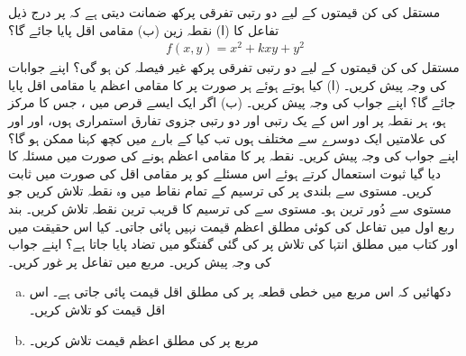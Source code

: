 مستقل  کی کن قیمتوں کے لیے دو رتبی تفرقی پرکھ ضمانت دیتی ہے کہ   پر درج ذیل تفاعل  کا (ا)  نقطہ زین (ب) مقامی اقل     پایا جائے گا؟
\begin{align*}
f(x,y)=x^2+kxy+y^2
\end{align*}
  مستقل  کی کن قیمتوں کے لیے دو رتبی تفرقی پرکھ غیر  فیصلہ کن ہو گی؟ اپنے جوابات کی وجہ پیش کریں۔
(ا) کیا  ہوتے ہوئے ہر   صورت  پر  کا مقامی اعظم  یا مقامی  اقل پایا جائے گا؟ اپنے جواب کی وجہ پیش کریں۔   (ب)  اگر ایک  ایسے قرص  میں ، جس کا مرکز   ہو،  ہر نقطہ پر   اور اس کے یک رتبی اور دو رتبی جزوی تفارق استمراری ہوں، اور  اور  کی علامتیں ایک دوسرے سے مختلف ہوں  تب کیا  کے بارے میں کچھ کہنا ممکن ہو گا؟ اپنے جواب کی وجہ پیش کریں۔
نقطہ  پر   کا   مقامی  اعظم  ہونے کی صورت میں  مسئلہ  کا دیا گیا  ثبوت استعمال کرتے ہوئے  اس مسئلے  کو  پر مقامی اقل    کی صورت میں ثابت کریں۔
مستوی   سے    بلندی  پر   کی ترسیم کے تمام نقاط میں وہ نقطہ تلاش کریں جو  مستوی سے دُور ترین ہو۔
مستوی  سے  کی ترسیم کا قریب ترین نقطہ تلاش کریں۔
بند ربع اول  میں تفاعل  کی کوئی مطلق اعظم قیمت نہیں پائی جاتی۔ کیا  اس حقیقت میں اور    کتاب میں  مطلق انتہا کی تلاش پر کی گئی گفتگو  میں تضاد پایا جاتا ہے؟ اپنے جواب کی وجہ پیش کریں۔
مربع  میں تفاعل  پر غور کریں۔
\begin{enumerate}[a.]
\item
دکھائیں کہ  اس مربع میں خطی قطعہ  پر  کی مطلق اقل  قیمت پائی جاتی ہے۔ اس اقل قیمت کو تلاش کریں۔
\item
مربع پر  کی مطلق اعظم قیمت تلاش کریں۔
\end{enumerate}

